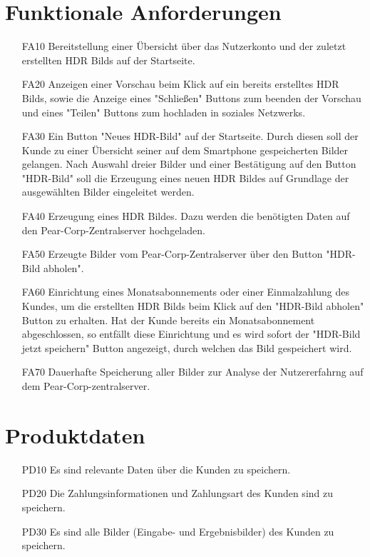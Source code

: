 \documentclass[parskip=full]{scrartcl}
\begin{document}
\section{Funktionale Anforderungen}
\begin{itemize}[nosep]
\item[FA10] Bereitstellung einer Übersicht über das Nutzerkonto und der zuletzt erstellten \glspl{HDR Bild} auf der Startseite.
\item[FA20] Anzeigen einer Vorschau beim Klick auf ein bereits erstelltes \glspl{HDR Bild}, sowie die Anzeige eines "Schließen" Buttons zum beenden der Vorschau und eines "Teilen" Buttons zum hochladen in \glspl{soziales Netzwerk}.
\item[FA30] Ein Button "Neues HDR-Bild" auf der Startseite. Durch diesen soll der \gls{Kunde} zu einer Übersicht seiner auf dem \gls{Smartphone} gespeicherten Bilder gelangen. Nach Auswahl dreier Bilder und einer Bestätigung auf den Button "HDR-Bild" soll die Erzeugung eines neuen \gls{HDR Bild}es auf Grundlage der ausgewählten Bilder eingeleitet werden.
\item[FA40] Erzeugung eines \gls{HDR Bild}es. Dazu werden die benötigten Daten auf den Pear-Corp-Zentralserver hochgeladen. 
\item[FA50] Erzeugte Bilder vom Pear-Corp-Zentralserver über den Button "HDR-Bild abholen".
\item[FA60] Einrichtung eines Monatsabonnements oder einer Einmalzahlung des \glspl{Kunde}, um die erstellten \glspl{HDR Bild} beim Klick auf den "HDR-Bild abholen" Button zu erhalten. Hat der \gls{Kunde} bereits ein Monatsabonnement abgeschlossen, so entfällt diese Einrichtung und es wird sofort der "HDR-Bild jetzt speichern" Button angezeigt, durch welchen das Bild gespeichert wird.
\item[FA70] Dauerhafte Speicherung aller Bilder zur Analyse der Nutzererfahrng auf dem Pear-Corp-zentralserver.
\end{itemize}

\section{Produktdaten}
\begin{itemize}[nosep]
\item[PD10] Es sind relevante Daten über die Kunden zu speichern.
\item[PD20] Die Zahlungsinformationen und Zahlungsart des Kunden sind zu speichern.
\item[PD30] Es sind alle Bilder (Eingabe- und Ergebnisbilder) des Kunden zu speichern.
\end{itemize}
\end{document}
